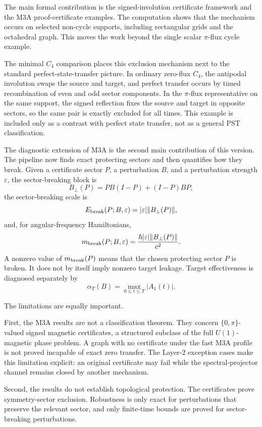 \documentclass[11pt]{article}
\theoremstyle{definition}
\begin{document}
The main formal contribution is the signed-involution certificate framework and the M3A proof-certificate examples. The computation shows that the mechanism occurs on selected non-cycle supports, including rectangular grids and the octahedral graph. This moves the work beyond the single scalar $\pi$-flux cycle example.

The minimal $C_4$ comparison places this exclusion mechanism next to the standard perfect-state-transfer picture. In ordinary zero-flux $C_4$, the antipodal involution swaps the source and target, and perfect transfer occurs by timed recombination of even and odd sector components. In the $\pi$-flux representative on the same support, the signed reflection fixes the source and target in opposite sectors, so the same pair is exactly excluded for all times. This example is included only as a contrast with perfect state transfer, not as a general PST classification.

The diagnostic extension of M3A is the second main contribution of this version. The pipeline now finds exact protecting sectors and then quantifies how they break. Given a certificate sector $P$, a perturbation $B$, and a perturbation strength $\varepsilon$, the sector-breaking block is
\[
B_\perp(P)=PB(I-P)+(I-P)BP,
\]
the sector-breaking scale is
\[
E_{\rm break}(P;B,\varepsilon)=|\varepsilon|\|B_\perp(P)\|,
\]
and, for angular-frequency Hamiltonians,
\[
m_{\rm break}(P;B,\varepsilon)=\frac{\hbar|\varepsilon|\|B_\perp(P)\|}{c^2}.
\]
A nonzero value of $m_{\rm break}(P)$ means that the chosen protecting sector $P$ is broken. It does not by itself imply nonzero target leakage. Target effectiveness is diagnosed separately by
\[
\alpha_T(B)=\max_{0\le t\le T}|A_1(t)|.
\]

The limitations are equally important.

First, the M3A results are not a classification theorem. They concern $\{0,\pi\}$-valued signed magnetic certificates, a structured subclass of the full $U(1)$-magnetic phase problem. A graph with no certificate under the fast M3A profile is not proved incapable of exact zero transfer.  The Layer-2 exception cases make this limitation explicit: an original certificate may fail while the spectral-projector channel remains closed by another mechanism.

Second, the results do not establish topological protection. The certificates prove symmetry-sector exclusion. Robustness is only exact for perturbations that preserve the relevant sector, and only finite-time bounds are proved for sector-breaking perturbations.
\end{document}
